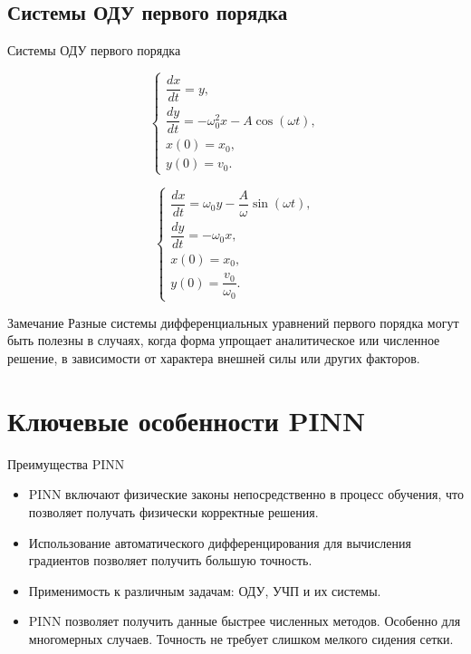 \documentclass{beamer}
\begin{document}
\subsection{Системы ОДУ первого порядка}
\begin{frame}{Системы ОДУ первого порядка}
    \begin{minipage}[t]{0.45\textwidth}
        \begin{equation}
            \begin{cases}
            \dfrac{dx}{dt} = y, \\
            \dfrac{dy}{dt} = -\omega_0^2 x - A\cos(\omega t), \\
            x(0) = x_0, \\
            y(0) = v_0.
            \end{cases}
        \end{equation}
        \vspace{0.5cm}
    \end{minipage}
    \begin{minipage}[t]{0.45\textwidth}
        \begin{equation}
            \begin{cases}
            \dfrac{dx}{dt} = \omega_0 y - \dfrac{A}{\omega}\sin(\omega t), \\
            \dfrac{dy}{dt} = -\omega_0 x, \\
            x(0) = x_0, \\
            y(0) = \dfrac{v_0}{\omega_0}.
            \end{cases}
        \end{equation}
    \end{minipage}

    \begin{block}{Замечание}
        Разные системы дифференциальных уравнений первого порядка могут быть полезны в случаях, когда форма упрощает аналитическое или численное решение, в зависимости от характера внешней силы или других факторов.
    \end{block}

\end{frame}

\section{Ключевые особенности PINN}
\begin{frame}{Преимущества PINN}
    \begin{itemize}
        \item PINN включают физические законы непосредственно в процесс обучения, что позволяет получать физически корректные решения.
        \item Использование автоматического дифференцирования для вычисления градиентов позволяет получить большую точность.
        \item Применимость к различным задачам: ОДУ, УЧП и их системы.
        \item PINN позволяет получить данные быстрее численных методов. Особенно для многомерных случаев. Точность не требует слишком мелкого сидения сетки.
    \end{itemize}
\end{frame}
\end{document}
